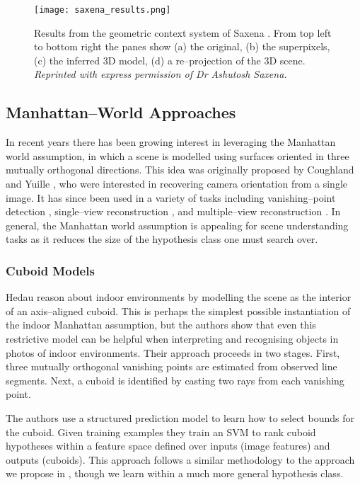 \begin{figure}[tb]
\centering
\texttt{[image: saxena\_results.png]}
\caption{Results from the geometric context system of Saxena \etal
  \cite{Saxena09}. From top left to bottom right the panes show (a)
  the original, (b) the superpixels, (c) the inferred 3D model, (d) a
  re--projection of the 3D scene.
  \textit{Reprinted with express permission of Dr Ashutosh Saxena.}
  }
\label{fig:saxena-result}
\end{figure}

\subsection{Manhattan--World Approaches}

In recent years there has been growing interest in leveraging the
Manhattan world assumption, in which a scene is modelled using
surfaces oriented in three mutually orthogonal directions. This idea
was originally proposed by Coughland and Yuille \cite{Coughlan99}, who
were interested in recovering camera orientation from a single
image. It has since been used in a variety of tasks including
vanishing--point detection \cite{Zhang02}, single--view reconstruction
\cite{Lee09,Flint10eccv}, and multiple--view reconstruction
\cite{Furukawa09,Flint11}. In general, the Manhattan world assumption
is appealing for scene understanding tasks as it reduces the size of
the hypothesis class one must search over.

\subsubsection{Cuboid Models}

Hedau \etal \cite{Hedau09} reason about indoor environments by
modelling the scene as the interior of an axis--aligned cuboid. This
is perhaps the simplest possible instantiation of the indoor Manhattan
assumption, but the authors show that even this restrictive model can
be helpful when interpreting and recognising objects in photos of
indoor environments. Their approach proceeds in two stages. First,
three mutually orthogonal vanishing points are estimated from
observed line segments. Next, a cuboid is identified by casting two
rays from each vanishing point.

The authors use a structured prediction model to learn how to select
bounds for the cuboid. Given training examples they train an SVM to
rank cuboid hypotheses within a feature space defined over inputs
(image features) and outputs (cuboids)\changedsinceviva. This approach
follows a similar methodology to the approach we propose in
, though we learn within a much more general
hypothesis class.

